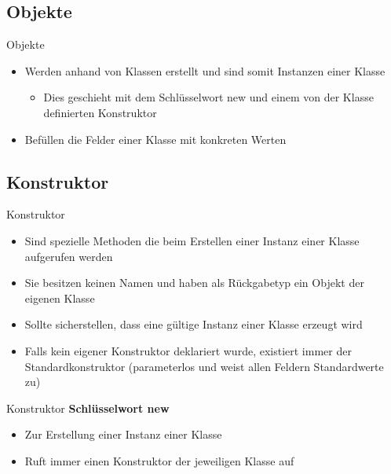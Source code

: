 \subsection{Objekte}
\begin{frame}{Objekte}
	\begin{itemize}
		\item Werden anhand von Klassen erstellt und sind somit Instanzen einer Klasse
		\begin{itemize}
			\item Dies geschieht mit dem Schlüsselwort \alert{new} und einem von der Klasse definierten Konstruktor
		\end{itemize}
		\item Befüllen die Felder einer Klasse mit konkreten Werten
	\end{itemize}
		
\end{frame}

\subsection{Konstruktor}
\begin{frame}{Konstruktor}
	\begin{itemize}
		\item Sind spezielle Methoden die beim Erstellen einer Instanz einer Klasse aufgerufen werden
		\item Sie besitzen keinen Namen und haben als Rückgabetyp ein Objekt der eigenen Klasse
		\item Sollte sicherstellen, dass eine gültige Instanz einer Klasse erzeugt wird
		\item Falls kein eigener Konstruktor deklariert wurde, existiert immer der Standardkonstruktor (parameterlos und weist allen Feldern Standardwerte zu)
	\end{itemize}
		
\end{frame}

\begin{frame}{Konstruktor}
	\textbf{Schlüsselwort new}\\
	\begin{itemize}
		\item Zur Erstellung einer Instanz einer Klasse
		\item Ruft immer einen Konstruktor der jeweiligen Klasse auf
	\end{itemize}
	
\end{frame}

